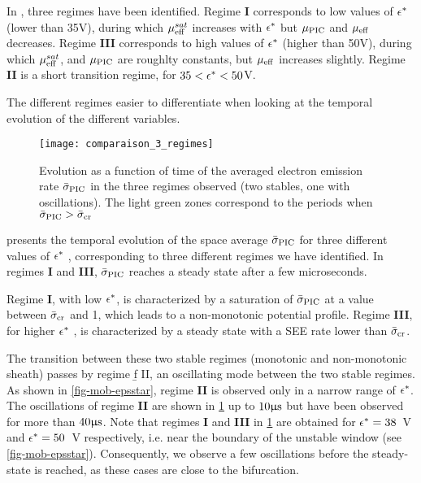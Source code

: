   In , three regimes have been identified.
  Regime {\bf I} corresponds to low values of $\epsilon^{*}$ (lower than 35V), during which $\mu_{\mathrm{eff}}^{sat}$ increases with $\epsilon^{*}$ but $\mu_{\mathrm{PIC}}$ and $\mu_{\mathrm{eff}}$ decreases.
  Regime {\bf III} corresponds to high values of $\epsilon^{*}$ (higher than 50V), during which $\mu_{\mathrm{eff}}^{sat}$, and  $\mu_{\mathrm{PIC}}$ are roughlty constants, but $\mu_{\mathrm{eff}}$ increases slightly.
  Regime {\bf II} is a short transition regime, for $35 < \epsilon^{*} < 50$V.
  
  The different regimes easier to differentiate when looking at the temporal evolution of the different variables.
  

  \begin{figure}[hbtp]
    \centering
    \texttt{[image: comparaison\_3\_regimes]}
    \caption{Evolution as a function of time of the averaged electron emission rate $ \bar{\sigma }_{\rm PIC} $ in the three regimes observed (two stables, one with oscillations). The light green zones correspond to the periods when $ \bar{\sigma }_{\rm PIC}  >  \bar{\sigma }_{\rm cr} $}
    \label{fig-threeregimes}
  \end{figure}
  
    presents the temporal evolution of the space average $ \bar{\sigma }_{\rm PIC} $ for three different
  values of $\epsilon^{*}$ , corresponding to three different regimes we have identified.
  In regimes {\bf I} and {\bf III}, $ \bar{\sigma }_{\rm PIC} $ reaches a steady state after a few microseconds.
 
  Regime {\bf I}, with low $\epsilon^{*}$, is characterized by a saturation of $ \bar{\sigma }_{\rm PIC} $ at a value between $ \bar{\sigma }_{\rm cr} $ and 1, which leads to a non-monotonic potential profile.
  Regime {\bf III}, for higher $\epsilon^{*}$ , is characterized by a steady state with a SEE rate lower than $ \bar{\sigma }_{\rm cr} $.

  The transition between these two stable regimes (monotonic and non-monotonic sheath) passes by regime {\b f II}, an oscillating mode between the two stable regimes.
   As shown in \cref{fig-mob-epsstar}, regime {\bf II} is observed only in a narrow range of $\epsilon^{*}$.
   The oscillations of regime {\bf II} are shown in \cref{fig-threeregimes} up to $10\mathrm{\upmu s}$ but have been observed for more than $40\mathrm{\upmu s}$.
   Note that regimes {\bf I} and {\bf III} in \cref{fig-threeregimes} are obtained for $\epsilon^{*} = 38$~V and $\epsilon^{*} = 50$~V respectively, i.e. near the boundary of the unstable window (see \cref{fig-mob-epsstar}).
   Consequently, we observe a few oscillations before the steady-state is reached, as these cases are close to the bifurcation.
   
